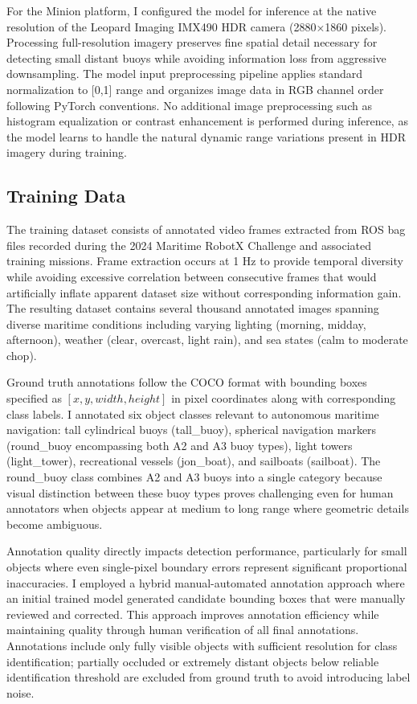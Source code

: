 \documentclass{erauthesis}
\begin{document}
For the Minion platform, I configured the model for inference at the native resolution of the Leopard Imaging IMX490 \ac{HDR} camera (2880×1860 pixels).
Processing full-resolution imagery preserves fine spatial detail necessary for detecting small distant buoys while avoiding information loss from aggressive downsampling.
The model input preprocessing pipeline applies standard normalization to [0,1] range and organizes image data in RGB channel order following PyTorch conventions.
No additional image preprocessing such as histogram equalization or contrast enhancement is performed during inference, as the model learns to handle the natural dynamic range variations present in \ac{HDR} imagery during training.

\subsection{Training Data} \label{sec:yolo_training data}

The training dataset consists of annotated video frames extracted from ROS bag files recorded during the 2024 Maritime RobotX Challenge and associated training missions.
Frame extraction occurs at 1 Hz to provide temporal diversity while avoiding excessive correlation between consecutive frames that would artificially inflate apparent dataset size without corresponding information gain.
The resulting dataset contains several thousand annotated images spanning diverse maritime conditions including varying lighting (morning, midday, afternoon), weather (clear, overcast, light rain), and sea states (calm to moderate chop).

Ground truth annotations follow the COCO format with bounding boxes specified as $[x, y, width, height]$ in pixel coordinates along with corresponding class labels.
I annotated six object classes relevant to autonomous maritime navigation: tall cylindrical buoys (tall\_buoy), spherical navigation markers (round\_buoy encompassing both A2 and A3 buoy types), light towers (light\_tower), recreational vessels (jon\_boat), and sailboats (sailboat).
The round\_buoy class combines A2 and A3 buoys into a single category because visual distinction between these buoy types proves challenging even for human annotators when objects appear at medium to long range where geometric details become ambiguous.

Annotation quality directly impacts detection performance, particularly for small objects where even single-pixel boundary errors represent significant proportional inaccuracies.
I employed a hybrid manual-automated annotation approach where an initial trained model generated candidate bounding boxes that were manually reviewed and corrected.
This approach improves annotation efficiency while maintaining quality through human verification of all final annotations.
Annotations include only fully visible objects with sufficient resolution for class identification; partially occluded or extremely distant objects below reliable identification threshold are excluded from ground truth to avoid introducing label noise.
\end{document}
